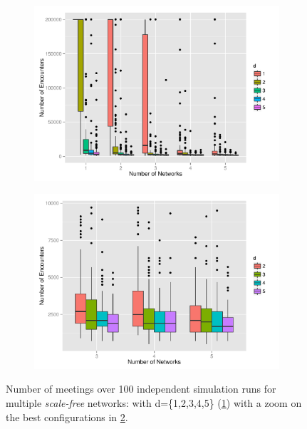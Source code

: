 \documentclass[preprint,number]{elsarticle}
\begin{document}
      \begin{figure}[H]
        \centering
	\begin{subfigure}{.49\linewidth}
          \centering
          \includegraphics[width=1\linewidth]{"../analysis/pdf/context_permeability_encounters_sf"}
          \caption{}
          \label{fig:ctx_perm_sf_full}
	\end{subfigure}%
	\begin{subfigure}{.49\linewidth}
          \centering
          \includegraphics[width=1\linewidth]{"../analysis/pdf/context_permeability_encounters_sf_best"}
          \caption{}
          \label{fig:ctx_perm_sf_best}
	\end{subfigure}
	\begin{minipage}{0.9\linewidth}
		\vspace{0.2cm}
		\caption{Number of meetings over 100 independent simulation runs for multiple
                  \textit{scale-free} networks: with d=\{1,2,3,4,5\} (\ref{fig:ctx_perm_sf_full})
                  with a zoom on the best configurations in \ref{fig:ctx_perm_sf_best}.}
		\label{fig:ctx_perm_sf}
              \end{minipage}
      \end{figure}
\end{document}
